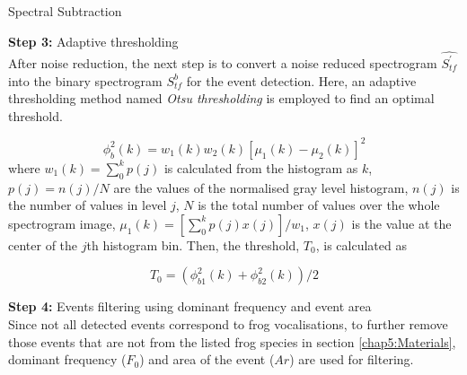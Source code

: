 \begin{algorithm}
\DontPrintSemicolon
{}

\caption{Spectral Subtraction\label{IR}}

\end{algorithm}

\noindent \textbf{Step 3:} Adaptive thresholding
\\
\noindent After noise reduction, the next step is to convert a noise reduced spectrogram $\hat{S^{'}_{tf}}$ into the binary spectrogram $S^{b}_{tf}$ for the event detection. Here, an adaptive thresholding method named \textit{Otsu thresholding} \citep{otsu1975threshold} is employed to find an optimal threshold.

\begin{equation}
\phi_{b}^{2}(k)=w_{1}(k)w_{2}(k)[\mu_{1}(k)-\mu_{2}(k)]^{2}
\end{equation}
\noindent where $w_{1}(k)=\sum_{0}^{k}p(j)$ is calculated from the histogram as $k$, $p(j)=n(j)/N$ are the values of the normalised gray level histogram, $n(j)$ is the number of values in level $j$, $N$ is the total number of values over the whole spectrogram image, $\mu_{1}(k)=[\sum_{0}^{k}p(j)x(j)]/w_{1}$, $x(j)$ is the value at the center of the $j$th histogram bin. Then, the threshold, $T_{0}$, is calculated as

\begin{equation}
T_{0}= (\phi_{b1}^{2}(k) + \phi_{b2}^{2}(k)) / 2
\end{equation}


\noindent \textbf{Step 4:} Events filtering using dominant frequency and event area \\
Since not all detected events correspond to frog vocalisations, to further remove those events that are not from the listed frog species in section \ref{chap5:Materials}, dominant frequency ($F_{0}$) and area of the event ($Ar$) are used for filtering.


